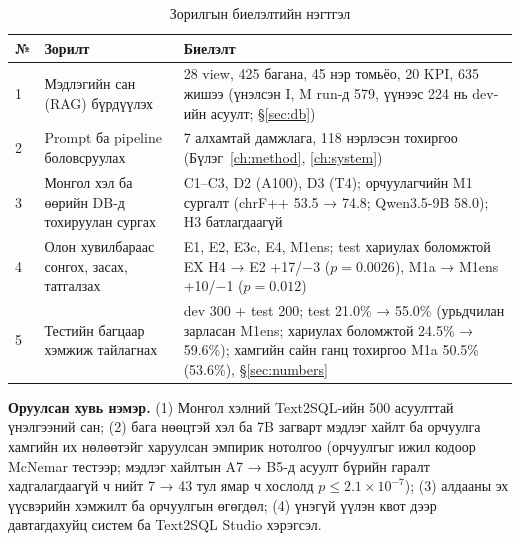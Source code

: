 \begin{table}[H]
\centering\small
\caption{Зорилгын биелэлтийн нэгтгэл}
\label{tab:goals-met}
\begin{tabularx}{\textwidth}{p{0.5cm}X p{5.4cm}}
\toprule
№ & Зорилт & Биелэлт \\
\midrule
1 & Мэдлэгийн сан (RAG) бүрдүүлэх & 28 view, 425 багана, 45 нэр томьёо, 20 KPI, 635 жишээ (үнэлсэн I, M run-д 579, үүнээс 224 нь dev-ийн асуулт; §\ref{sec:db}) \\
2 & Prompt ба pipeline боловсруулах & 7 алхамтай дамжлага, 118 нэрлэсэн тохиргоо (Бүлэг~\ref{ch:method}, \ref{ch:system}) \\
3 & Монгол хэл ба өөрийн DB-д тохируулан сургах & C1--C3, D2 (A100), D3 (T4); орчуулагчийн M1 сургалт (chrF++ 53.5 → 74.8; Qwen3.5-9B 58.0); H3 батлагдаагүй \\
4 & Олон хувилбараас сонгох, засах, татгалзах & E1, E2, E3c, E4, M1ens; test хариулах боломжтой EX H4 → E2 +17/−3 ($p = 0.0026$), M1a → M1ens +10/−1 ($p = 0.012$) \\
5 & Тестийн багцаар хэмжиж тайлагнах & dev 300 + test 200; test 21.0\% → 55.0\% (урьдчилан зарласан M1ens; хариулах боломжтой 24.5\% → 59.6\%); хамгийн сайн ганц тохиргоо M1a 50.5\% (53.6\%), §\ref{sec:numbers} \\
\bottomrule
\end{tabularx}
\end{table}

\textbf{Оруулсан хувь нэмэр.} (1) Монгол хэлний Text2SQL-ийн 500 асуулттай үнэлгээний сан; (2) бага нөөцтэй хэл ба 7B
загварт мэдлэг хайлт ба орчуулга хамгийн их нөлөөтэйг харуулсан эмпирик нотолгоо (орчуулгыг ижил кодоор McNemar
тестээр; мэдлэг хайлтын A7 → B5-д асуулт бүрийн гаралт хадгалагдаагүй ч нийт 7 → 43 тул ямар ч хослолд
$p \leq 2.1\times10^{-7}$); (3) алдааны эх
үүсвэрийн хэмжилт ба орчуулгын өгөгдөл; (4) үнэгүй үүлэн квот дээр давтагдахуйц систем ба Text2SQL Studio хэрэгсэл.

